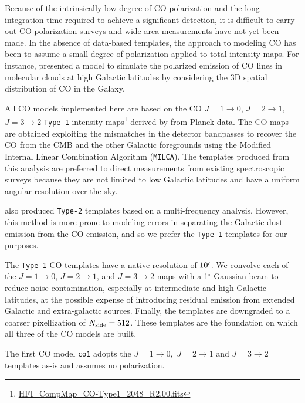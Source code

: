 \documentclass[twocolumn]{aastex631}
\begin{document}
Because of the intrinsically low degree of CO polarization and the long integration time required to achieve a significant detection, it is difficult to carry out CO polarization surveys and wide area measurements have not yet been made. In the absence of data-based templates, the approach to modeling CO has been to assume a small degree of polarization applied to total intensity maps. For instance, \citet{Puglisi:2017} presented a model to simulate the polarized emission of CO lines in molecular clouds at high Galactic latitudes by considering the 3D spatial distribution of CO in the Galaxy. %

All CO models implemented here are based on the CO $J = 1\rightarrow0$, $J = 2\rightarrow1$, $J = 3\rightarrow2$ \texttt{Type-1} intensity maps\footnote{\url{HFI_CompMap_CO-Type1_2048_R2.00.fits}} derived by \citet{planck2013-p03a} from Planck data. The CO maps are obtained exploiting the mismatches in the detector bandpasses to recover the CO from the CMB and the other Galactic foregrounds using the Modified Internal Linear Combination Algorithm (\texttt{MILCA}). The templates produced from this analysis are preferred to direct measurements from existing spectroscopic surveys \citep[e.g.,][]{Dame:2001} because they are not limited to low Galactic latitudes and have a uniform angular resolution over the sky.

\citet{planck2013-p03a} also produced \texttt{Type-2} templates based on a multi-frequency analysis. However, this method is more prone to modeling errors in separating the Galactic dust emission from the CO emission, and so we prefer the \texttt{Type-1} templates for our purposes.

The \texttt{Type-1} CO templates have a native resolution of $10\mbox{$^\prime$}$. We convolve each of the $J = 1\rightarrow0$, $J = 2\rightarrow1$, and $J = 3\rightarrow2$ maps with a 1$^\circ$ Gaussian beam to reduce noise contamination, especially at intermediate and high Galactic latitudes, at the possible expense of introducing residual emission from extended Galactic and extra-galactic sources. Finally, the templates are downgraded to a coarser pixellization of $N_{\rm side} = 512$. These templates are the foundation on which all three of the CO models are built.

The first CO model \texttt{co1} adopts the $J = 1\rightarrow0,$  $J = 2\rightarrow1$ and $J = 3\rightarrow2$ templates as-is and assumes no polarization. 
\end{document}
